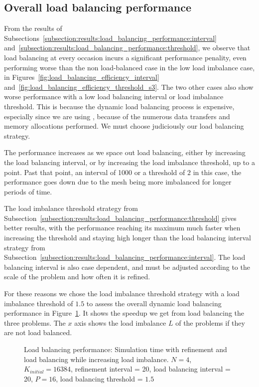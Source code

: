 \subsection{Overall load balancing performance}\label{subsection:results:load_balancing_performance:overall}

From the results of Subsections~\ref{subsection:results:load_balancing_performance:interval}
and~\ref{subsection:results:load_balancing_performance:threshold}, we observe that load balancing at
every occasion incurs a significant performance penality, even performing worse than the non
load-balanced case in the low load imbalance case, in
Figures~\ref{fig:load_balancing_efficiency_interval}
and~\ref{fig:load_balancing_efficiency_threshold_s3}. The two other cases also show worse
performance with a low load balancing interval or load imbalance threshold. This is because the
dynamic load balancing process is expensive, especially since we are using ,
because of the numerous data transfers and memory allocations performed. We must choose judiciously
our load balancing strategy. 

The performance increases as we space out load balancing, either by
increasing the load balancing interval, or by increasing the load imbalance threshold, up to a
point. Past that point, an interval of 1000 or a threshold of \(2\) in this case, the performance
goes down due to the mesh being more imbalanced for longer periods of time.

The load imbalance threshold strategy from
Subsection~\ref{subsection:results:load_balancing_performance:threshold} gives better results, with
the performance reaching its maximum much faster when increasing the threshold and staying high
longer than the load balancing interval strategy from
Subsection~\ref{subsection:results:load_balancing_performance:interval}. The load balancing interval
is also case dependent, and must be adjusted according to the scale of the problem and how often it
is refined. 

For these reasons we chose the load imbalance threshold strategy with a load imbalance threshold of
\(1.5\) to assess the overall dynamic load balancing performance in
Figure~\ref{fig:load_balancing_efficiency}. It shows the speedup we get from load balancing the
three problems. The \(x\) axis shows the load imbalance \(L\) of the problems if they are not load
balanced.

\begin{figure}[H]
	\centering
	
	\caption{Load balancing performance: Simulation time with refinement and load balancing while increasing load imbalance. \(N = 4\), \(K_{initial} = 16384\), refinement interval = 20, load balancing interval = 20, \(P = 16\), load balancing threshold = \(1.5\)}\label{fig:load_balancing_efficiency}
\end{figure}

